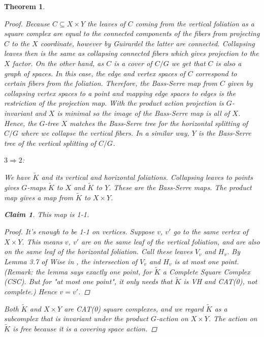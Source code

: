 \documentclass[12pt,parskip=full]{report}
\theoremstyle{plain}
\newtheorem{thm}{Theorem}[section]
\theoremstyle{definition}
\newtheorem*{claim*}{Claim}
\begin{document}
\begin{thm}
\begin{proof}
    Because $C\subseteq X\times Y$ the leaves of $C$ coming from the vertical foliation as a square complex are equal to the connected components of the fibers from projecting $C$ to the $X$ coordinate, however by Guirardel the latter are connected. Collapsing leaves then is the same as collapsing connected fibers which gives projection to the $X$ factor. On the other hand, as \(C\) is a cover of \(C/G\) we get that \(C\) is also a graph of spaces. In this case, the edge and vertex spaces of \(C\) correspond to certain fibers from the foliation. Therefore, the Bass-Serre map from \(C\) given by collapsing vertex spaces to a point and mapping edge spaces to edges is the restriction of the projection map. With the product action projection is \(G\)-invariant and \(X\) is minimal so the image of the Bass-Serre map is all of \(X\). Hence, the \(G\)-tree \(X\) matches the Bass-Serre tree for the horizontal splitting of \(C/G\) where we collapse the vertical fibers. In a similar way, \(Y\) is the Bass-Serre tree of the vertical splitting of \(C/G\).
    
    
\item $3\Rightarrow 2$: 

    We have \(\widetilde K\) and its vertical and horizontal foliations. Collapsing
leaves to points gives \(G\)-maps \(\widetilde K\) to \(X\) and \(\widetilde K\) to \(Y\). These are the
Bass-Serre maps. The product map gives a map from \(\widetilde K\) to \(X\times Y\).

\begin{claim*} This map is 1-1.
\begin{proof}

It's enough to be 1-1 on vertices. Suppose \(v\), \(v'\) go to the same
vertex of \(X\times Y\). This means \(v\), \(v'\) are on the same leaf of the vertical foliation, and are also on the same leaf of the horizontal foliation.
Call these leaves \(V_v\) and \(H_v\).
By Lemma 3.7 of Wise in \cite{wisecsc}, the intersection of \(V_v\) and \(H_v\) is at most
one point. (Remark: the lemma says exactly one point, for \(\widetilde K\) a Complete Square Complex (CSC).
But for "at most one point", it only needs that \(\widetilde K\) is VH and CAT(0),
not complete.) Hence \(v = v'\).
\end{proof}
\end{claim*}

Both \(\widetilde K\) and \(X\times Y\) are CAT(0) square complexes, and we regard \(\widetilde K\) as a
subcomplex that is invariant under the product \(G\)-action on \(X\times Y\). The
action on \(\widetilde K\) is free because it is a covering space action.


\end{proof}
\end{thm}
\end{document}
